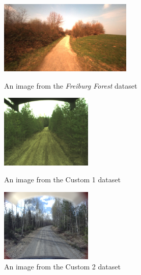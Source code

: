 \documentclass[USenglish]{ifimaster}  %
\begin{document}
\begin{figure}[!htb]
  \includegraphics[width=\linewidth, height=3.5cm]{bilder/freiburg.png}
  \caption{An image from the \textit{Freiburg Forest} dataset}\label{fig:awesome_image1}
\endminipage\hfill
{}
  \includegraphics[width=\linewidth, height=3.5cm]{bilder/custom_1.png}
  \caption{An image from the Custom 1 dataset}\label{fig:awesome_image2}
\endminipage\hfill
{}%
  \includegraphics[width=\linewidth, height=3.5cm]{bilder/custom_2.png}
  \caption{An image from the Custom 2 dataset}\label{fig:awesome_image3}
\endminipage
\end{figure}
\end{document}
